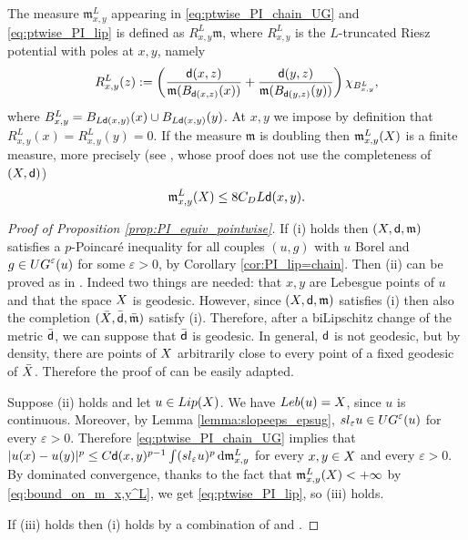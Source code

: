 \documentclass[12pt]{amsart}
\newcommand{\sfd}{{\sf d}}
\renewcommand{\d}{{\mathrm d}}
\newcommand{\X}{{\rm X}}
\newcommand{\Lip}{{\rm Lip}}
\newcommand{\mm}{\mathfrak m}
\theoremstyle{definition}
\renewcommand{\sl}[1]{{\rm sl}_{#1}}
\newcommand{\UG}[1]{{\rm UG}^{#1}}
\begin{document}
%
The measure $\mm_{x,y}^L$ appearing in \eqref{eq:ptwise_PI_chain_UG} and \eqref{eq:ptwise_PI_lip} is defined as $R_{x,y}^L \mm$, where $R_{x,y}^L$ is the $L$-truncated Riesz potential with poles at $x,y$, namely
$$R_{x,y}^L(z) := \left(\frac{\sfd(x,z)}{\mm(B_{\sfd(x,z)}(x))} + \frac{\sfd(y,z)}{\mm(B_{\sfd(y,z)}(y))}\right) \chi_{B_{x,y}^L},$$
where $B_{x,y}^L = B_{L\sfd(x,y)}(x) \cup B_{L\sfd(x,y)}(y)$. At $x,y$ we impose by definition that $R_{x,y}^L(x) = R_{x,y}^L(y) = 0$.
If the measure $\mm$ is doubling
then $\mm_{x,y}^L(\X)$ is a finite measure, more precisely (see \cite[Proposition 2.3]{CaputoCavallucci2024}, whose proof does not use the completeness of $(\X,\sfd)$)
\begin{equation}
    \label{eq:bound_on_m_x,y^L}
    \mm_{x,y}^L(\X) \le 8C_DL\sfd(x,y).
\end{equation}
%
\begin{proof}[Proof of Proposition \ref{prop:PI_equiv_pointwise}]
    If (i) holds then $(\X,\sfd,\mm)$ satisfies a $p$-Poincaré inequality for all couples $(u,g)$ with $u$ Borel and $g\in \UG{\varepsilon}(u)$ for some $\varepsilon > 0$, by Corollary \ref{cor:PI_lip=chain}. Then (ii) can be proved as in \cite[Theorem 9.5]{Hei01}. Indeed two things are needed: that $x,y$ are Lebesgue points of $u$ and that the space $\X$ is geodesic. However, since $(\X,\sfd,\mm)$ satisfies (i) then also the completion $(\bar{\X},\bar{\sfd},\bar{\mm})$ satisfy (i). Therefore, after a biLipschitz change of the metric $\bar{\sfd}$, we can suppose that $\bar{\sfd}$ is geodesic. In general, $\sfd$ is not geodesic, but by density, there are points of $\X$ arbitrarily close to every point of a fixed geodesic of $\bar{\X}$. Therefore the proof of \cite[Theorem 9.5]{Hei01} can be easily adapted.

    Suppose (ii) holds and let $u\in \Lip(\X)$. We have ${\rm Leb}(u) = \X$, since $u$ is continuous. Moreover, by Lemma \ref{lemma:slopeeps_epsug}, $\sl{\varepsilon}u \in \UG{\varepsilon}(u)$ for every $\varepsilon > 0$. Therefore \eqref{eq:ptwise_PI_chain_UG} implies that $\vert u(x) - u(y) \vert^p \le C\sfd(x,y)^{p-1}\int (\sl{\varepsilon}u)^p \,\d\mm_{x,y}^L$ for every $x,y\in \X$ and every $\varepsilon > 0$. By dominated convergence, thanks to the fact that $\mm_{x,y}^L(\X) < +\infty$ by \eqref{eq:bound_on_m_x,y^L}, we get \eqref{eq:ptwise_PI_lip}, so (iii) holds.

    If (iii) holds then (i) holds by a combination of \cite[Theorem 9.5]{Hei01} and \cite[Theorem 8.1.7]{HKST15}.
\end{proof}
\end{document}
